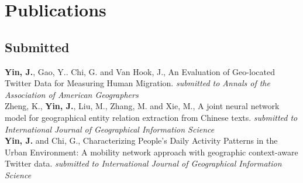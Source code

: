 \documentclass[11pt, a4paper]{article}
\newcommand{\years}[1]{\marginnote{\scriptsize #1}}
\begin{document}
\section*{Publications}
\subsection*{Submitted}
\years{2019} \textbf{Yin, J.}, Gao, Y.. Chi, G. and Van Hook, J., An Evaluation of Geo-located Twitter Data for Measuring Human Migration. \textit{submitted to Annals of the Association of American Geographers}\\
\years{2019} Zheng, K., \textbf{Yin, J.}, Liu, M., Zhang, M. and Xie, M., A joint neural network model for geographical entity relation extraction from Chinese texts. \textit{submitted to International Journal of Geographical Information Science}\\
\years{2019}\textbf{Yin, J.} and  Chi, G., Characterizing People’s Daily Activity Patterns in the Urban Environment: A mobility network approach with geographic context-aware Twitter data. \textit{submitted to International Journal of Geographical Information Science}
\end{document}
